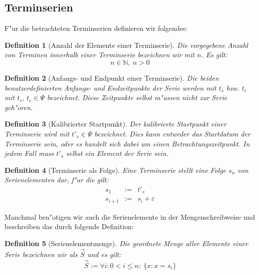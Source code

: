 \documentclass[a4paper]{article}
\numberwithin{equation}{section}
\newtheorem{dfn}{Definition}
\begin{document}
%
%
\subsection{Terminserien}
F"ur die betrachteten Terminserien definieren wir folgendes:

\begin{dfn}[Anzahl der Elemente einer Terminserie]\label{def:numOfElements}
  Die vorgegebene Anzahl von Terminen innerhalb einer Terminserie bezeichnen wir
  mit $n$. Es gilt:
  \begin{equation}n \in \mathbb{N},\ n > 0\end{equation}
\end{dfn}

\begin{dfn}[Anfangs- und Endpunkt einer Terminserie]
  Die beiden benutzerdefinierten Anfangs- und Endzeitpunkte der Serie werden mit
  $t_s$ bzw. $t_e$ mit $t_s,\,t_e \in \Psi$ bezeichnet. Diese Zeitpunkte selbst
  m"ussen nicht zur Serie geh"oren.
\end{dfn}

\begin{dfn}[Kalibrierter Startpunkt]
  Der kalibrierte Startpunkt einer Terminserie wird mit $t'_s \in \Psi$
  bezeichnet. Dies kann entweder das Startdatum der Terminserie sein, oder es
  handelt sich dabei um einen Betrachtungszeitpunkt. In jedem Fall muss $t'_s$
  selbst ein Element der Serie sein.
\end{dfn}

\begin{dfn}[Terminserie als Folge]\label{def:seriesAsSeries}
  Eine Terminserie stellt eine Folge $s_n$ von Serienelementen dar, f"ur die
  gilt:
  \begin{eqnarray}
    s_1 & := & t'_s \\
    s_{i+1} & := & s_i + \varepsilon
  \end{eqnarray}
\end{dfn}

\noindent Manchmal ben"otigen wir auch die Serienelemente in der
Mengenschreibweise und beschreiben das durch folgende Definition:
\begin{dfn}[Serienelementmenge]
  Die geordnete Menge aller Elemente einer Serie bezeichnen wir als $\vec{S}$
  und es gilt:
  \begin{equation}
    \vec{S} := \forall i : 0 < i \le n :\ \{ x : x = s_i \}
  \end{equation}
\end{dfn}
\end{document}
